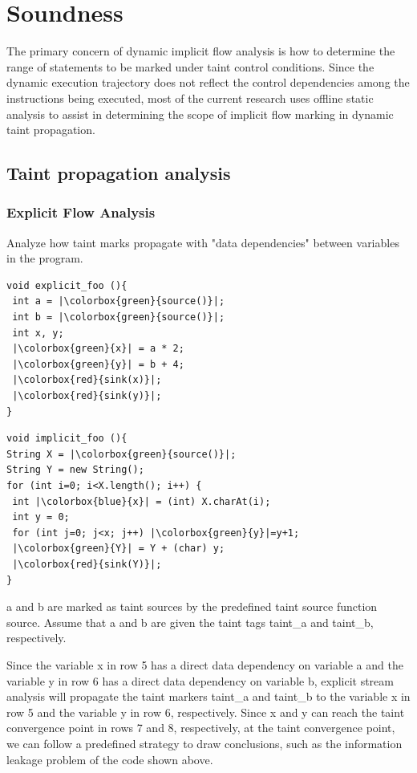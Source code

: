 \documentclass[conference]{IEEEtran}
\begin{document}
\section{Soundness}
The primary concern of dynamic implicit flow analysis is how to determine the range of statements to be marked under taint control conditions. Since the dynamic execution trajectory does not reflect the control dependencies among the instructions being executed, most of the current research uses offline static analysis to assist in determining the scope of implicit flow marking in dynamic taint propagation.

\subsection{Taint propagation analysis}
\subsubsection{Explicit Flow Analysis}
Analyze how taint marks propagate with "data dependencies" between variables in the program.
\setlength{\columnsep}{-2cm}
\begin{multicols}{2}
    \begin{verbatim}
void explicit_foo (){
 int a = |\colorbox{green}{source()}|;
 int b = |\colorbox{green}{source()}|;
 int x, y;
 |\colorbox{green}{x}| = a * 2;
 |\colorbox{green}{y}| = b + 4;
 |\colorbox{red}{sink(x)}|;
 |\colorbox{red}{sink(y)}|;
}

\end{verbatim}
    \begin{verbatim}
void implicit_foo (){
String X = |\colorbox{green}{source()}|;
String Y = new String();
for (int i=0; i<X.length(); i++) {
 int |\colorbox{blue}{x}| = (int) X.charAt(i);
 int y = 0;
 for (int j=0; j<x; j++) |\colorbox{green}{y}|=y+1;
 |\colorbox{green}{Y}| = Y + (char) y;
 |\colorbox{red}{sink(Y)}|;
}
\end{verbatim}
\end{multicols}
a and b are marked as taint sources by the predefined taint source function source.
Assume that a and b are given the taint tags taint\_a and taint\_b, respectively.

Since the variable x in row 5 has a direct data dependency on variable a and the variable y in row 6 has a direct data dependency on variable b, explicit stream analysis will propagate the taint markers taint\_a and taint\_b to the variable x in row 5 and the variable y in row 6, respectively.
Since x and y can reach the taint convergence point in rows 7 and 8, respectively, at the taint convergence point, we can follow a predefined strategy to draw conclusions, such as the information leakage problem of the code shown above.
\end{document}
